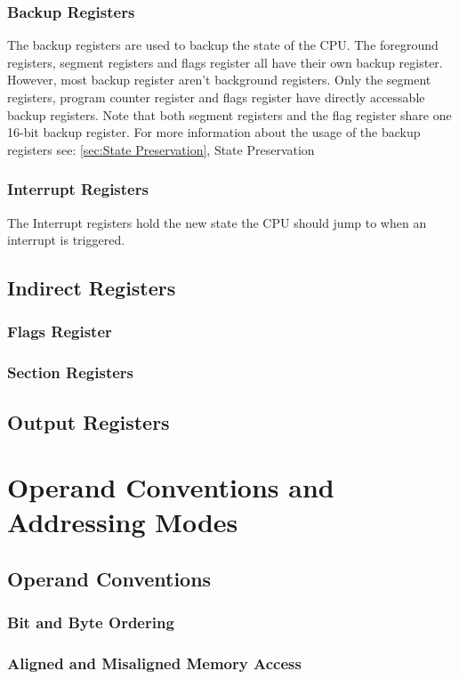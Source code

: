 \documentclass[oneside, a4paper]{memoir}
\begin{document}
\subsection{Backup Registers}
The backup registers are used to backup the state of the CPU. The foreground registers, segment registers and flags register all have their own backup register. However, most backup register aren't background registers. Only the segment registers, program counter register and flags register have directly accessable backup registers. Note that both segment registers and the flag register share one 16-bit backup register.
For more information about the usage of the backup registers see: \autoref{sec:State Preservation}, State Preservation
\subsection{Interrupt Registers}
The Interrupt registers hold the new state the CPU should jump to when an interrupt is triggered. 
\section{Indirect Registers}
\subsection{Flags Register}
\subsection{Section Registers}
\section{Output Registers}

\chapter{Operand Conventions and Addressing Modes}
\section{Operand Conventions}
\subsection{Bit and Byte Ordering}
\subsection{Aligned and Misaligned Memory Access}
\end{document}
